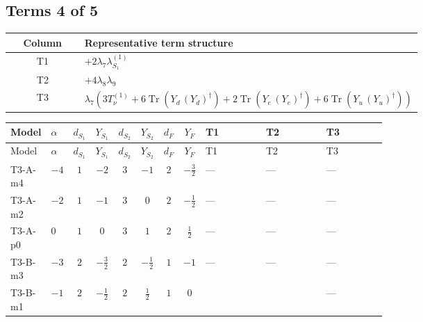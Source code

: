 \documentclass[8pt]{article}
\begin{document}
\begin{landscape}
\subsection*{Terms 4 of 5}
\begin{center}
\begin{tabular}{@{}c >{\raggedright\arraybackslash}p{0.82\linewidth}@{}}
\toprule
Column & Representative term structure \\
\midrule
T1 & \(\displaystyle +2 {\lambda_{7}} {\lambda_{S_1}^{(1)}}\) \\
\midrule
T2 & \(\displaystyle +4 {\lambda_{8}} {\lambda_{9}}\) \\
\midrule
T3 & \(\displaystyle {\lambda_{7}} (3 T_{\nu}^{(1)}+6 \operatorname{Tr}\!\left({Y_d}\,\left({Y_d}\right)^{\dagger}\right)+2 \operatorname{Tr}\!\left({Y_e}\,\left({Y_e}\right)^{\dagger}\right)+6 \operatorname{Tr}\!\left({Y_u}\,\left({Y_u}\right)^{\dagger}\right))\) \\
\midrule
\bottomrule
\end{tabular}
\end{center}
\smallskip
\tiny
\begin{longtable}{@{}llcccccc >{\raggedright\arraybackslash}p{0.21\linewidth} >{\raggedright\arraybackslash}p{0.21\linewidth} >{\raggedright\arraybackslash}p{0.21\linewidth}@{}}
\toprule
Model & $\alpha$ & $d_{S_1}$ & $Y_{S_1}$ & $d_{S_2}$ & $Y_{S_2}$ & $d_F$ & $Y_F$ & T1 & T2 & T3 \\
\midrule
\endfirsthead
\toprule
Model & $\alpha$ & $d_{S_1}$ & $Y_{S_1}$ & $d_{S_2}$ & $Y_{S_2}$ & $d_F$ & $Y_F$ & T1 & T2 & T3 \\
\midrule
\endhead
T3-A-m4 & $-4$ & $1$ & $-2$ & $3$ & $-1$ & $2$ & $-\frac{3}{2}$ & --- & --- & --- \\
\midrule
T3-A-m2 & $-2$ & $1$ & $-1$ & $3$ & $0$ & $2$ & $-\frac{1}{2}$ & --- & --- & --- \\
\midrule
T3-A-p0 & $0$ & $1$ & $0$ & $3$ & $1$ & $2$ & $\frac{1}{2}$ & --- & --- & --- \\
\midrule
T3-B-m3 & $-3$ & $2$ & $-\frac{3}{2}$ & $2$ & $-\frac{1}{2}$ & $1$ & $-1$ & --- & --- & --- \\
\midrule
T3-B-m1 & $-1$ & $2$ & $-\frac{1}{2}$ & $2$ & $\frac{1}{2}$ & $1$ & $0$ & \scriptsize\adjustbox{max width=\linewidth}{$\begin{gathered} +2 {\lambda_{7}} {\lambda_{S_1}^{(1)}}\end{gathered}$} & \scriptsize\adjustbox{max width=\linewidth}{$\begin{gathered} +4 {\lambda_{8}} {\lambda_{9}}\end{gathered}$} & --- \\

\end{longtable}
\end{landscape}
\end{document}
